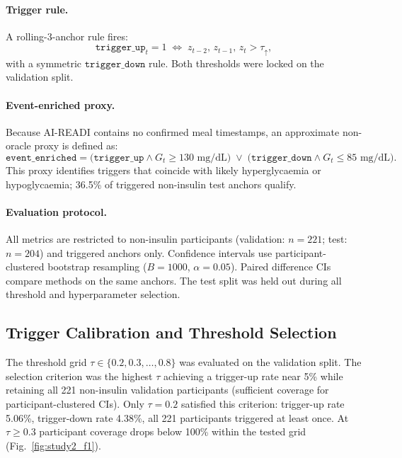 \paragraph{Trigger rule.}
A rolling-3-anchor rule fires:
\begin{equation}
  \mathtt{trigger\_up}_t = 1
  \;\iff\;
  z_{t-2},\,z_{t-1},\,z_t > \tau_{\uparrow},
  \label{eq:s2_trigger}
\end{equation}
with a symmetric $\mathtt{trigger\_down}$ rule.
Both thresholds were locked on the validation split.

\paragraph{Event-enriched proxy.}
Because AI-READI contains no confirmed meal timestamps, an approximate
non-oracle proxy is defined as:
\begin{equation}
  \mathtt{event\_enriched} =
  \bigl(\mathtt{trigger\_up} \wedge G_t \geq 130\text{ mg/dL}\bigr)
  \;\vee\;
  \bigl(\mathtt{trigger\_down} \wedge G_t \leq 85\text{ mg/dL}\bigr).
  \label{eq:s2_proxy}
\end{equation}
This proxy identifies triggers that coincide with likely hyperglycaemia or
hypoglycaemia; 36.5\% of triggered non-insulin test anchors qualify.

\paragraph{Evaluation protocol.}
All metrics are restricted to non-insulin participants (validation: $n=221$;
test: $n=204$) and triggered anchors only.
Confidence intervals use participant-clustered bootstrap resampling
($B=1000$, $\alpha=0.05$).
Paired difference CIs compare methods on the same anchors.
The test split was held out during all threshold and hyperparameter selection.

\subsection{Trigger Calibration and Threshold Selection}
\label{subsec:study2_trigger}

The threshold grid $\tau \in \{0.2, 0.3, \ldots, 0.8\}$ was evaluated on
the validation split.
The selection criterion was the highest $\tau$ achieving a trigger-up rate
near 5\% while retaining all 221 non-insulin validation participants
(sufficient coverage for participant-clustered CIs).
Only $\tau=0.2$ satisfied this criterion:
trigger-up rate 5.06\%, trigger-down rate 4.38\%, all 221 participants
triggered at least once.
At $\tau \geq 0.3$ participant coverage drops below 100\% within the tested
grid (Fig.~\ref{fig:study2_f1}).

